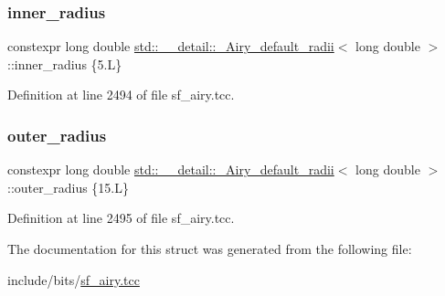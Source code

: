 \subsubsection{\texorpdfstring{inner\+\_\+radius}{inner\_radius}}
{\footnotesize\ttfamily constexpr long double \hyperlink{structstd_1_1____detail_1_1__Airy__default__radii}{std\+::\+\_\+\+\_\+detail\+::\+\_\+\+Airy\+\_\+default\+\_\+radii}$<$ long double $>$\+::inner\+\_\+radius \{5.\+L\}\hspace{0.3cm}{\ttfamily [static]}}



Definition at line 2494 of file sf\+\_\+airy.\+tcc.

\mbox{\label{structstd_1_1____detail_1_1__Airy__default__radii_3_01long_01double_01_4_ab46784c2c76dc0f43aeb85d22f8b21a7}} 
\subsubsection{\texorpdfstring{outer\+\_\+radius}{outer\_radius}}
{\footnotesize\ttfamily constexpr long double \hyperlink{structstd_1_1____detail_1_1__Airy__default__radii}{std\+::\+\_\+\+\_\+detail\+::\+\_\+\+Airy\+\_\+default\+\_\+radii}$<$ long double $>$\+::outer\+\_\+radius \{15.\+L\}\hspace{0.3cm}{\ttfamily [static]}}



Definition at line 2495 of file sf\+\_\+airy.\+tcc.



The documentation for this struct was generated from the following file\+:\begin{DoxyCompactItemize}
\item 
include/bits/\hyperlink{sf__airy_8tcc}{sf\+\_\+airy.\+tcc}\end{DoxyCompactItemize}
